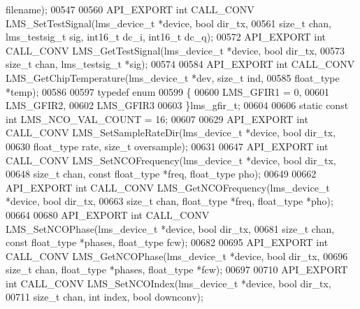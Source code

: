 \begin{DoxyCode}
      filename);
00547 
00560 API_EXPORT \textcolor{keywordtype}{int} CALL_CONV LMS_SetTestSignal(lms\_device\_t *device, \textcolor{keywordtype}{bool} dir_tx,
00561                     \textcolor{keywordtype}{size\_t} chan, lms\_testsig\_t sig, int16\_t dc_i, int16\_t dc_q);
00572 API_EXPORT \textcolor{keywordtype}{int} CALL_CONV LMS_GetTestSignal(lms\_device\_t *device, \textcolor{keywordtype}{bool} dir_tx,
00573                                                \textcolor{keywordtype}{size\_t} chan, lms\_testsig\_t *sig);
00574 
00584 API_EXPORT \textcolor{keywordtype}{int} CALL_CONV LMS_GetChipTemperature(lms\_device\_t *dev, \textcolor{keywordtype}{size\_t} ind,
00585                                                 float\_type *temp);
00586 
00597 \textcolor{keyword}{typedef} \textcolor{keyword}{enum}
00599 \{
00600     LMS_GFIR1 = 0,
00601     LMS_GFIR2,
00602     LMS_GFIR3
00603 \}lms_gfir_t;
00604 
00606 \textcolor{keyword}{static} \textcolor{keyword}{const} \textcolor{keywordtype}{int} LMS_NCO_VAL_COUNT = 16;
00607 
00629 API_EXPORT \textcolor{keywordtype}{int} CALL_CONV LMS_SetSampleRateDir(lms\_device\_t *device, \textcolor{keywordtype}{bool} dir_tx,
00630                                             float\_type rate, \textcolor{keywordtype}{size\_t} oversample);
00631 
00647 API_EXPORT \textcolor{keywordtype}{int} CALL_CONV LMS_SetNCOFrequency(lms\_device\_t *device, \textcolor{keywordtype}{bool} dir_tx,
00648                      \textcolor{keywordtype}{size\_t} chan, \textcolor{keyword}{const} float\_type *freq, float\_type pho);
00649 
00662 API_EXPORT \textcolor{keywordtype}{int} CALL_CONV LMS_GetNCOFrequency(lms\_device\_t *device, \textcolor{keywordtype}{bool} dir_tx,
00663                           \textcolor{keywordtype}{size\_t} chan, float\_type *freq, float\_type *pho);
00664 
00680 API_EXPORT \textcolor{keywordtype}{int} CALL_CONV LMS_SetNCOPhase(lms\_device\_t *device, \textcolor{keywordtype}{bool} dir_tx,
00681                    \textcolor{keywordtype}{size\_t} chan, \textcolor{keyword}{const} float\_type *phases, float\_type fcw);
00682 
00695 API_EXPORT \textcolor{keywordtype}{int} CALL_CONV LMS_GetNCOPhase(lms\_device\_t *device, \textcolor{keywordtype}{bool} dir_tx,
00696                             \textcolor{keywordtype}{size\_t} chan, float\_type *phases, float\_type *fcw);
00697 
00710 API_EXPORT \textcolor{keywordtype}{int} CALL_CONV LMS_SetNCOIndex(lms\_device\_t *device, \textcolor{keywordtype}{bool} dir_tx,
00711                                     \textcolor{keywordtype}{size\_t} chan, \textcolor{keywordtype}{int} index, \textcolor{keywordtype}{bool} downconv);

\end{DoxyCode}
